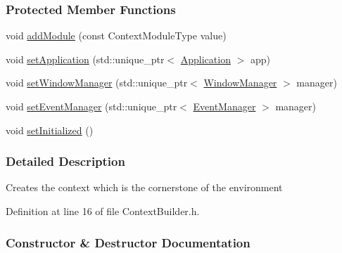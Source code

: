 \subsubsection*{Protected Member Functions}
\begin{DoxyCompactItemize}
\item 
void \hyperlink{a00005_a52fb449fadc5d3a074e3fc7bfb56744b}{add\+Module} (const Context\+Module\+Type value)
\item 
void \hyperlink{a00005_a20c5dafa6892142bc352c13a5f3ac09a}{set\+Application} (std\+::unique\+\_\+ptr$<$ \hyperlink{a00002}{Application} $>$ app)
\item 
void \hyperlink{a00005_a641fb06484bdb07220f445f14db8c0e7}{set\+Window\+Manager} (std\+::unique\+\_\+ptr$<$ \hyperlink{a00087}{Window\+Manager} $>$ manager)
\item 
void \hyperlink{a00005_a52b490a3ef4d2a5b5b7e8e0f82d9a27c}{set\+Event\+Manager} (std\+::unique\+\_\+ptr$<$ \hyperlink{a00034}{Event\+Manager} $>$ manager)
\item 
void \hyperlink{a00005_af23e3bdfb30ca9f2076cacc9029d96c2}{set\+Initialized} ()
\end{DoxyCompactItemize}


\subsubsection{Detailed Description}
Creates the context which is the cornerstone of the environment 

Definition at line 16 of file Context\+Builder.\+h.



\subsubsection{Constructor \& Destructor Documentation}
